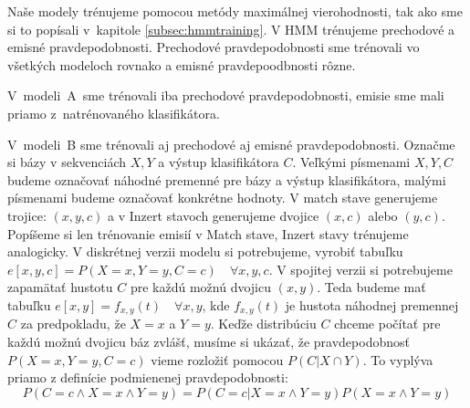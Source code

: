 
Naše modely trénujeme pomocou metódy maximálnej vierohodnosti, tak ako sme si to popísali v~kapitole \ref{subsec:hmmtraining}. V HMM trénujeme prechodové a emisné pravdepodobnosti. Prechodové pravdepodobnosti sme trénovali vo všetkých modeloch rovnako a emisné pravdepoodbnosti rôzne.

V~modeli~A~sme trénovali iba prechodové pravdepodobnosti, emisie sme mali priamo z~natrénovaného klasifikátora.

V~modeli~B sme trénovali aj prechodové aj emisné pravdepodobnosti.
Označme si bázy v sekvenciách $X, Y$ a výstup klasifikátora $C$. Veľkými písmenami $X, Y, C$ budeme označovať náhodné premenné pre bázy a výstup klasifikátora, malými písmenami budeme označovať konkrétne hodnoty. V match stave generujeme trojice: $(x, y, c)$ a v Inzert stavoch generujeme dvojice $(x, c)$ alebo $(y, c)$. Popíšeme si len trénovanie emisií v Match stave, Inzert stavy trénujeme analogicky. V diskrétnej verzii modelu si potrebujeme, vyrobiť tabuľku $e[x, y, c] = P(X=x, Y=y, C=c)\quad \forall x, y, c$. V spojitej verzii si potrebujeme zapamätať hustotu $C$ pre každú možnú dvojicu $(x, y)$. Teda budeme mať tabuľku $e[x, y] = f_{x,y}(t)\quad \forall x, y$, kde $f_{x,y}(t)$ je hustota náhodnej premennej $C$ za predpokladu, že $X=x$ a $Y=y$.
Keďže distribúciu $C$ chceme počítať pre každú možnú dvojicu báz zvlášť, musíme si ukázať, že pravdepodobnosť $P(X=x, Y=y, C=c)$ vieme rozložiť pomocou $P(C|X \cap Y)$. To vyplýva priamo z definície podmienenej pravdepodobnosti:
$$P\left(C=c \wedge X=x \wedge Y=y\right) = P\left(C=c | X=x \wedge Y=y\right) P\left(X=x \wedge Y=y\right)$$

